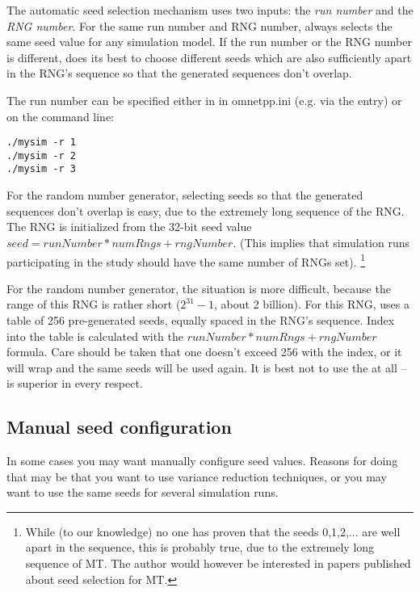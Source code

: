 The automatic seed selection mechanism uses two inputs: the \textit{run number}
 and the \textit{RNG number}. For the same run number and RNG number,
{\opp} always selects the same seed value for any simulation model.
If the run number or the RNG number is different, {\opp} does its best
to choose different seeds which are also sufficiently apart in the RNG's sequence
so that the generated sequences don't overlap.

The run number can be specified either in in omnetpp.ini (e.g. via the
 entry) or on the command line:

\begin{verbatim}
./mysim -r 1
./mysim -r 2
./mysim -r 3
\end{verbatim}

For the  random number generator, selecting seeds
so that the generated sequences don't overlap is easy,
due to the extremely long sequence of the RNG.
The RNG is initialized from the 32-bit seed value $seed = runNumber*numRngs + rngNumber$.
(This implies that simulation runs participating in the study should have
the same number of RNGs set).
    \footnote{While (to our knowledge) no one has proven that the seeds 0,1,2,...
    are well apart in the sequence, this is probably true, due to the extremely
    long sequence of MT. The author would however be interested in papers
    published about seed selection for MT.}

For the  random number generator, the situation is more difficult,
because the range of this RNG is rather short ($2^{31}-1$, about 2 billion).
For this RNG, {\opp} uses a table of 256 pre-generated seeds, equally spaced
in the RNG's sequence. Index into the table is calculated with the
$runNumber*numRngs + rngNumber$ formula. Care should be taken that
one doesn't exceed 256 with the index, or it will wrap and the
same seeds will be used again. It is best not to use the 
at all --  is superior in every respect.


\subsection{Manual seed configuration}

In some cases you may want manually configure seed values.
Reasons for doing that may be that you want to use variance reduction
techniques, or you may want to use the same seeds for several simulation
runs.

